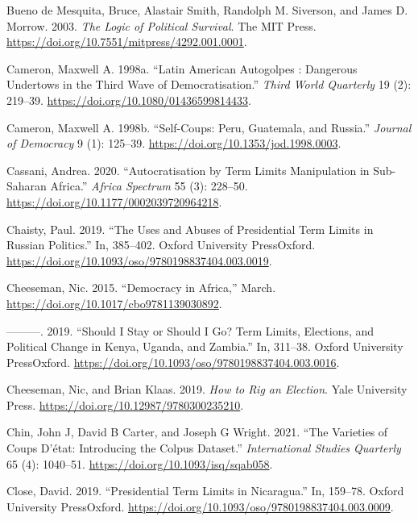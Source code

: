 \documentclass[
  12pt,
]{report}
\newlength{\cslhangindent}
\newenvironment{CSLReferences}[2] %
 {\begin{list}{}{%
  \setlength{\itemindent}{0pt}
  \setlength{\leftmargin}{0pt}
  \setlength{\parsep}{0pt}
  \ifodd #1
   \setlength{\leftmargin}{\cslhangindent}
   \setlength{\itemindent}{-1\cslhangindent}
  \fi
  \setlength{\itemsep}{#2\baselineskip}}}
 {\end{list}}
\begin{document}
\begin{CSLReferences}{1}{0}
Bueno de Mesquita, Bruce, Alastair Smith, Randolph M. Siverson, and
James D. Morrow. 2003. \emph{The Logic of Political Survival}. The MIT
Press. \url{https://doi.org/10.7551/mitpress/4292.001.0001}.

Cameron, Maxwell A. 1998a. {``Latin American Autogolpes : Dangerous
Undertows in the Third Wave of Democratisation.''} \emph{Third World
Quarterly} 19 (2): 219--39.
\url{https://doi.org/10.1080/01436599814433}.

Cameron, Maxwell A. 1998b. {``Self-Coups: Peru, Guatemala, and
Russia.''} \emph{Journal of Democracy} 9 (1): 125--39.
\url{https://doi.org/10.1353/jod.1998.0003}.

Cassani, Andrea. 2020. {``Autocratisation by Term Limits Manipulation in
Sub-Saharan Africa.''} \emph{Africa Spectrum} 55 (3): 228--50.
\url{https://doi.org/10.1177/0002039720964218}.

Chaisty, Paul. 2019. {``The Uses and Abuses of Presidential Term Limits
in Russian Politics.''} In, 385--402. Oxford University PressOxford.
\url{https://doi.org/10.1093/oso/9780198837404.003.0019}.

Cheeseman, Nic. 2015. {``Democracy in Africa,''} March.
\url{https://doi.org/10.1017/cbo9781139030892}.

---------. 2019. {``Should I Stay or Should I Go? Term Limits,
Elections, and Political Change in Kenya, Uganda, and Zambia.''} In,
311--38. Oxford University PressOxford.
\url{https://doi.org/10.1093/oso/9780198837404.003.0016}.

Cheeseman, Nic, and Brian Klaas. 2019. \emph{How to Rig an Election}.
Yale University Press. \url{https://doi.org/10.12987/9780300235210}.

Chin, John J, David B Carter, and Joseph G Wright. 2021. {``The
Varieties of Coups D{'}état: Introducing the Colpus Dataset.''}
\emph{International Studies Quarterly} 65 (4): 1040--51.
\url{https://doi.org/10.1093/isq/sqab058}.

Close, David. 2019. {``Presidential Term Limits in Nicaragua.''} In,
159--78. Oxford University PressOxford.
\url{https://doi.org/10.1093/oso/9780198837404.003.0009}.


\end{CSLReferences}
\end{document}
